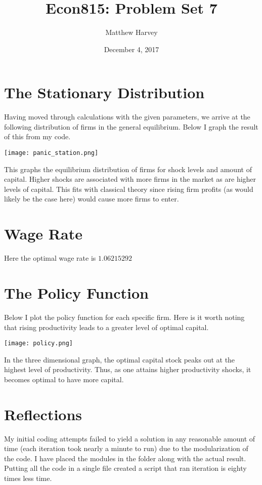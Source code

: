 \documentclass{article}
\title{Econ815: Problem Set 7}
\date{December 4, 2017}
\author{Matthew Harvey}
\begin{document}
\maketitle

\section*{The Stationary Distribution}
Having moved through calculations with the given parameters, we arrive at the following distribution of firms in the general equilibrium. Below I graph the result of this from my code.

\texttt{[image: panic\_station.png]}

This graphs the equilibrium distribution of firms for shock levels and amount of capital. Higher shocks are associated with more firms in the market as are higher levels of capital. This fits with classical theory since rising firm profits (as would likely be the case here) would cause more firms to enter.

\section*{Wage Rate}
Here the optimal wage rate is $1.06215292$

\section*{The Policy Function}
Below I plot the policy function for each specific firm. Here is it worth noting that rising productivity leads to a greater level of optimal capital.

\texttt{[image: policy.png]}

In the three dimensional graph, the optimal capital stock peaks out at the highest level of productivity. Thus, as one attains higher productivity shocks, it becomes optimal to have more capital.

\section*{Reflections}
My initial coding attempts failed to yield a solution in any reasonable amount of time (each iteration took nearly a minute to run) due to the modularization of the code. I have placed the modules in the folder along with the actual result. Putting all the code in a single file created a script that ran iteration is eighty times less time.
\end{document}
